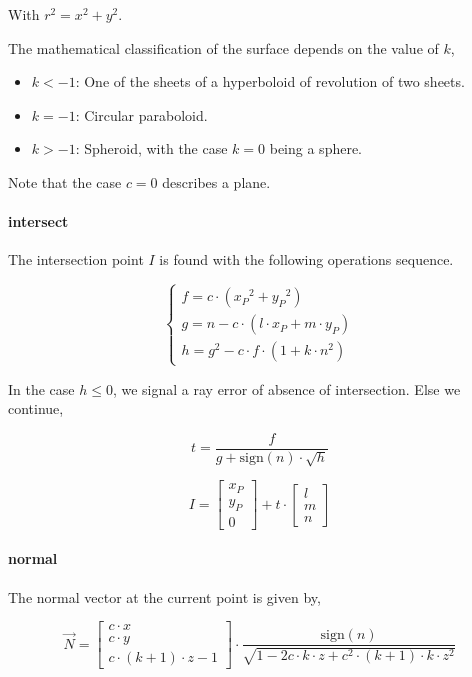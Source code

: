 With $r^2 = x^2 + y^2$.

The mathematical classification of the surface depends on the value of
$k$,

\begin{itemize}
\item $k < -1$: One of the sheets of a hyperboloid of revolution of two sheets.
\item $k = -1$: Circular paraboloid.
\item $k > -1$: Spheroid, with the case $k=0$ being a sphere.
\end{itemize}

Note that the case $c=0$ describes a plane.

\paragraph{intersect}
The intersection point $I$ is found with the following operations sequence.

\begin{equation} \begin{cases}
f = c \cdot ({x_P}^2 + {y_P}^2) \\
g = n - c \cdot (l \cdot x_P + m \cdot y_P) \\
h = g^2 - c \cdot f \cdot (1 + k \cdot n^2)
\end{cases} \end{equation}

In the case $h \leq 0$, we signal a ray error of absence of intersection.
Else we continue,

\begin{equation}
t = \frac{f}{g + \textrm{sign}(n) \cdot \sqrt{h}}
\end{equation}

\begin{equation}
I = \begin{bmatrix} x_P \\ y_P \\ 0 \end{bmatrix} + t \cdot
    \begin{bmatrix} l \\ m \\ n \end{bmatrix}
\end{equation}

\paragraph{normal}
The normal vector at the current point is given by,

\begin{equation}
\overrightarrow{N} =
\begin{bmatrix}
c \cdot x \\ c \cdot y \\ c \cdot (k+1) \cdot z - 1
\end{bmatrix} \cdot
\frac{\textrm{sign}(n)}{
\sqrt{1 - 2 c \cdot k \cdot z + c^2 \cdot (k+1) \cdot k \cdot z^2}}
\end{equation}

